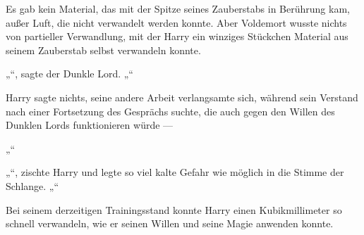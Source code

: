 Es gab kein Material, das mit der Spitze seines Zauberstabs in Berührung kam, außer Luft, die nicht verwandelt werden konnte. Aber Voldemort wusste nichts von partieller Verwandlung, mit der Harry ein winziges Stückchen Material aus seinem Zauberstab selbst verwandeln konnte.

„“, sagte der Dunkle Lord. „“

Harry sagte nichts, seine andere Arbeit verlangsamte sich, während sein Verstand nach einer Fortsetzung des Gesprächs suchte, die auch gegen den Willen des Dunklen Lords funktionieren würde —

„“

„“, zischte Harry und legte so viel kalte Gefahr wie möglich in die Stimme der Schlange. „“

Bei seinem derzeitigen Trainingsstand konnte Harry einen Kubikmillimeter so schnell verwandeln, wie er seinen Willen und seine Magie anwenden konnte.

